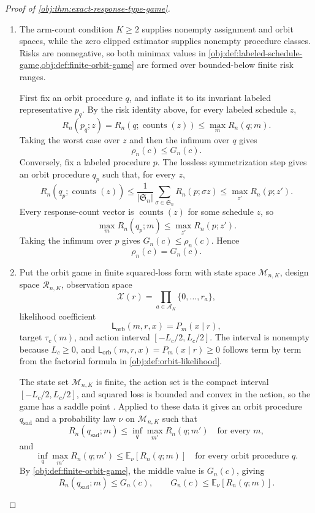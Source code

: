 \begin{proof}[Proof of \cref{obj:thm:exact-response-type-game}]
\begin{enumerate}
\item The arm-count condition \(K\ge2\) supplies nonempty assignment and orbit spaces, while the zero clipped estimator supplies nonempty procedure classes.  Risks are nonnegative, so both minimax values in \cref{obj:def:labeled-schedule-game,obj:def:finite-orbit-game} are formed over bounded-below finite risk ranges.

First fix an orbit procedure \(q\), and inflate it to its invariant labeled representative \(p_q\).  By the risk identity above, for every labeled schedule \(z\),
\[
R_n(p_q;z)=R_n(q;\operatorname{counts}(z))
\le
\max_m R_n(q;m).
\]
Taking the worst case over \(z\) and then the infimum over \(q\) gives
\[
\rho_n(c)\le G_n(c).
\]
Conversely, fix a labeled procedure \(p\).  The lossless symmetrization step gives an orbit procedure \(q_p\) such that, for every \(z\),
\[
R_n(q_p;\operatorname{counts}(z))
\le
\frac{1}{|\mathfrak S_n|}
\sum_{\sigma\in\mathfrak S_n}R_n(p;\sigma z)
\le
\max_{z'}R_n(p;z').
\]
Every response-count vector is \(\operatorname{counts}(z)\) for some schedule \(z\), so
\[
\max_m R_n(q_p;m)\le \max_{z'}R_n(p;z').
\]
Taking the infimum over \(p\) gives \(G_n(c)\le\rho_n(c)\).  Hence
\[
\rho_n(c)=G_n(c).
\] %

\item Put the orbit game in finite squared-loss form with state space \(\mathcal M_{n,K}\), design space \(\mathcal R_{n,K}\), observation space
\[
\mathcal X(r)=\prod_{a\in\mathcal A_K}\{0,\ldots,r_a\},
\]
likelihood coefficient
\[
\mathsf L_{\mathrm{orb}}(m,r,x)=P_m(x\mid r),
\]
target \(\tau_c(m)\), and action interval \([-L_c/2,L_c/2]\).  The interval is nonempty because \(L_c\ge0\), and \(\mathsf L_{\mathrm{orb}}(m,r,x)=P_m(x\mid r)\ge0\) follows term by term from the factorial formula in \cref{obj:def:orbit-likelihood}.

The state set \(\mathcal M_{n,K}\) is finite, the action set is the compact interval \([-L_c/2,L_c/2]\), and squared loss is bounded and convex in the action, so the game has a saddle point \citep{wald_1950}.  Applied to these data it gives an orbit procedure \(q_{\mathrm{sad}}\) and a probability law \(\nu\) on \(\mathcal M_{n,K}\) such that
\[
R_n(q_{\mathrm{sad}};m)\le
\inf_q\max_{m'}R_n(q;m')
\quad\text{for every }m,
\]
and
\[
\inf_q\max_{m'}R_n(q;m')
\le
\mathbb E_{\nu}\!\left[R_n(q;m)\right]
\quad\text{for every orbit procedure }q.
\]
By \cref{obj:def:finite-orbit-game}, the middle value is \(G_n(c)\), giving
\[
R_n(q_{\mathrm{sad}};m)\le G_n(c),
\qquad
G_n(c)\le \mathbb E_{\nu}\!\left[R_n(q;m)\right].
\] %
\end{enumerate}
\end{proof}

